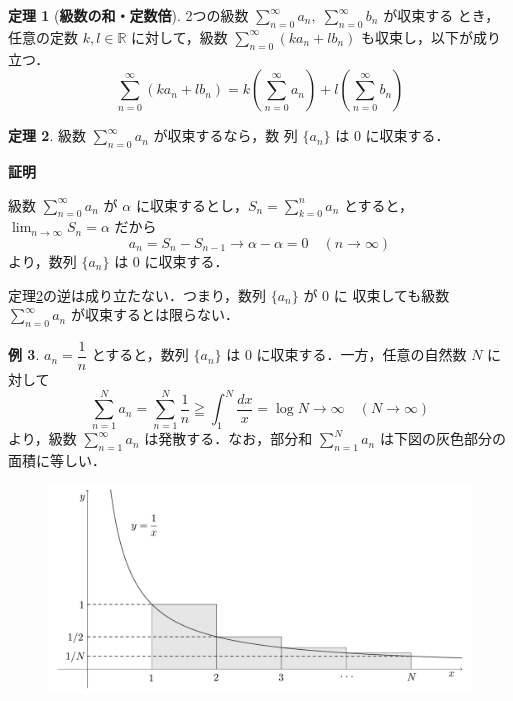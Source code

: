 \documentclass[10pt, uplatex, dvipdfmx]{jsarticle}
\makeatletter
\renewenvironment{proof}[1][\proofname]{\par
  \pushQED{\qed}%
  \normalfont \topsep6\p@\@plus6\p@\relax
  \trivlist
  \item\relax
  {\bfseries
  #1\@addpunct{.}}\hspace\labelsep\ignorespaces
}{%
  \popQED\endtrivlist\@endpefalse
}
\theoremstyle{definition}
\newtheorem{theorem}{定理}[section]
\newtheorem{example}[theorem]{例}
\renewcommand{\proofname}{\textbf{証明}}
\numberwithin{equation}{section}
\newcommand{\ds}{\displaystyle}
\makeatother
\begin{document}
\begin{theorem}[\textbf{級数の和・定数倍}]\label{thm:linear} 2つの級数
  $\ds \sum_{n=0}^{\infty} a_n, \; \sum_{n=0}^{\infty} b_n$ が収束する
  とき，任意の定数 $k, l \in \mathbb{R}$ に対して，級数
  $\ds \sum_{n=0}^{\infty} \left(k a_n+ lb_n\right)$ も収束し，以下が成り立つ．
  \[
    \sum_{n=0}^{\infty}\left( k a_n + l b_n\right)
    = k\left(\sum_{n=0}^{\infty}a_n\right) + l \left(\sum_{n=0}^{\infty} b_n\right)
  \]
\end{theorem}

\begin{theorem}\label{thm:seq0}
  級数 $\ds \sum_{n=0}^{\infty} a_n$ が収束するなら，数
  列 $\{a_n\}$ は $0$ に収束する．
\end{theorem}

\begin{proof}
  級数 $\ds \sum_{n=0}^{\infty} a_n$ が $\alpha$
  に収束するとし，$\ds S_n=\sum_{k=0}^{n}a_n$ とすると，$\ds \lim_{n \to \infty}S_n=\alpha$ だから
  \[
    a_n = S_n - S_{n-1}  \to \alpha - \alpha =0 \quad (n \to \infty)
  \]
  より，数列 $\{a_n\}$ は $0$ に収束する．
\end{proof}

定理\ref{thm:seq0}の逆は成り立たない．つまり，数列 $\{a_n\}$ が $0$ に
収束しても級数 $\ds \sum_{n=0}^{\infty}a_n$ が収束するとは限らない．

\begin{example}\label{exmp:harmonic}
  $a_n=\dfrac{1}{n}$ とすると，数列 $\{a_n\}$ は $0$ に収束する．一方，任意の自然数 $N$ に対して
  \[
    \sum_{n=1}^{N}a_n=\sum_{n=1}^{N} \frac{1}{n}
    \geqq \int_{1}^{N}\frac{dx}{x} = \log N \to \infty \quad (N \to \infty)
  \]
  より，級数 $\ds \sum_{n=1}^{\infty} a_n$ は発散する．なお，部分和 $\ds \sum_{n=1}^{N} a_n$ は下図の灰色部分の面積に等しい．
  \begin{figure}[h]
    \centering
    \includegraphics[width=15cm]{./pictures/06/harmonic.pdf}
  \end{figure}
\end{example}
\end{document}
